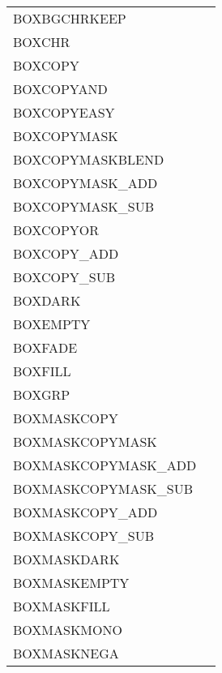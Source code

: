 {\begin{supertabular}{l@{\hs}l}
  BOXBGCHRKEEP              &\\
  BOXCHR                    &\\
  BOXCOPY                   &               \\
  BOXCOPYAND                &                \\
  BOXCOPYEASY               &          \\
  BOXCOPYMASK               &           \\
  BOXCOPYMASKBLEND          &          \\
  BOXCOPYMASK\_ADD          &            \\
  BOXCOPYMASK\_SUB          &            \\
  BOXCOPYOR                 &                 \\
  BOXCOPY\_ADD              &                \\
  BOXCOPY\_SUB              &                \\
  BOXDARK                   &              \\
  BOXEMPTY                  &            \\
  BOXFADE                   &               \\
  BOXFILL                   &               \\
  BOXGRP                    &\\
  BOXMASKCOPY               &       \\
  BOXMASKCOPYMASK           &   \\
  BOXMASKCOPYMASK\_ADD      &    \\
  BOXMASKCOPYMASK\_SUB      &    \\
  BOXMASKCOPY\_ADD          &        \\
  BOXMASKCOPY\_SUB          &        \\
  BOXMASKDARK               &\\
  BOXMASKEMPTY              &\\
  BOXMASKFILL               &\\
  BOXMASKMONO               &\\
  BOXMASKNEGA               &\\

\end{supertabular}}
